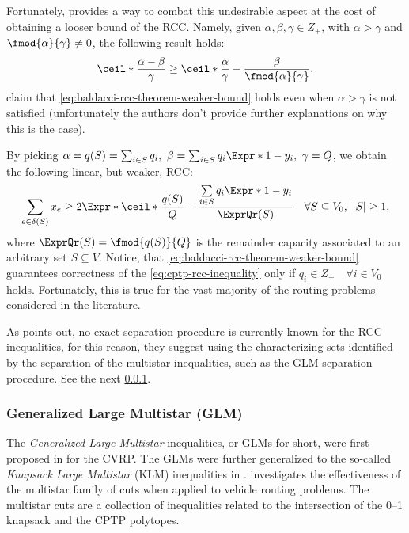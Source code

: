 Fortunately, \textcite{baldacci2007capacitated} provides a way to
combat this undesirable aspect at the cost of obtaining a looser bound of the RCC.
Namely, given $\alpha, \beta, \gamma \in Z_+$, with $\alpha > \gamma$ and
$\fmod{\alpha}{\gamma} \ne 0$, the following result holds:
\begin{equation}
	\label{eq:baldacci-rcc-theorem-weaker-bound}
	\ceil*{\frac{\alpha - \beta}{\gamma}} \ge \ceil*{\frac{\alpha}{\gamma}} - \frac{\beta}{\fmod{\alpha}{\gamma}}.
\end{equation}
\textcite{jepsen2014} claim that \cref{eq:baldacci-rcc-theorem-weaker-bound}
holds even when $\alpha > \gamma$ is not satisfied
(unfortunately the authors don't provide further explanations on why this is the case).

By picking $\alpha = q(S) = \sum_{i \in S} q_i,\ \beta = \sum_{i \in S} q_i\Expr*{1 - y_i},\ \gamma = Q$,
we obtain the following linear, but weaker, RCC:
\begin{equation}
	\label{eq:cptp-rcc-inequality}
	\sum\limits_{e \in \delta(S)} x_e \ge 2 \Expr*{\ceil*{\frac{q(S)}{Q}} - \frac{\sum\limits_{i \in S} q_i \Expr*{1 - y_i}}{\ExprQr(S)}} \quad \forall S \subseteq V_0,\ |S| \ge 1,
\end{equation}
where $\ExprQr(S) = \fmod{q(S)}{Q}$ is the remainder capacity associated
to an arbitrary set $S \subseteq V$.
Notice, that \cref{eq:baldacci-rcc-theorem-weaker-bound} guarantees correctness
of the \cref{eq:cptp-rcc-inequality} only if $q_i \in Z_+ \quad \forall i \in V_0$ holds.
Fortunately, this is true for the vast majority of the routing problems considered in the literature.

As \textcite{jepsen2014} points out,
no exact separation procedure is currently known for the RCC inequalities,
for this reason,
they suggest using the characterizing sets identified by the separation of the multistar inequalities,
such as the GLM separation procedure.
See the next \cref{sec:cptp-glm}.

\subsubsection{Generalized Large Multistar (GLM)}
\label{sec:cptp-glm}

The \textit{Generalized Large Multistar} inequalities,
or GLMs for short,
were first proposed in \textcite{gouveia1995} for the CVRP.
The GLMs were further generalized
to the so-called \textit{Knapsack Large Multistar} (KLM) inequalities in \textcite{letchford2002}.
\textcite{letchford2006} investigates the effectiveness of the multistar family of cuts
when applied to vehicle routing problems.
The multistar cuts are a collection of inequalities
related to the intersection  of the 0--1 knapsack and the CPTP polytopes.

